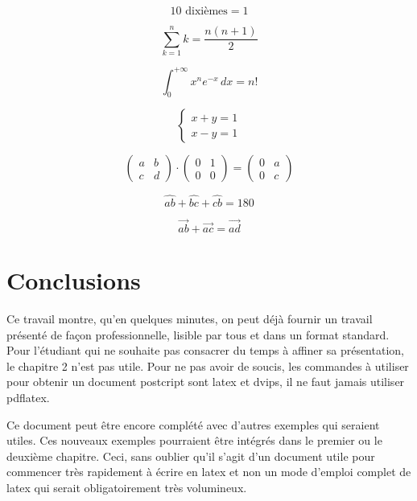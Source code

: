 $$ 10 \textrm{ dixièmes} = 1 $$

\begin{equation}
\sum_{k=1}^n k = \frac{n(n+1)}{2}
\end{equation}

\begin{equation}
\int_0^{+\infty} x^n e^{-x}\,dx = n!
\end{equation}

$$\left \{\begin{array}{c}x+y=1\\x-y=1\end{array}\right.$$

\begin{equation}
\left( \begin{array}{cc} a & b \\ c & d \end{array} \right) \cdot
\left( \begin{array}{cc} 0 & 1 \\ 0 & 0 \end{array} \right) =
\left( \begin{array}{cc} 0 & a \\ 0 & c \end{array} \right)
\end{equation}

$$\widehat{ab} + \widehat{bc} + \widehat{cb} = 180$$

$$\overrightarrow{ab} + \overrightarrow{ac} = \overrightarrow{ad}$$



\section{Conclusions}
Ce travail montre, qu'en quelques minutes, on peut déjà fournir un travail présenté de façon professionnelle, lisible par tous et dans un format standard.
Pour l'étudiant qui ne souhaite pas consacrer du temps à affiner sa présentation, le chapitre 2 n'est pas utile.
Pour ne pas avoir de soucis, les commandes à utiliser pour obtenir un document postcript sont latex et dvips, il ne faut jamais utiliser pdflatex. 

Ce document peut être encore complété avec d'autres exemples qui seraient utiles. Ces nouveaux exemples pourraient être intégrés dans le premier ou le deuxième chapitre. Ceci, sans oublier qu'il s'agit d'un document utile pour commencer très rapidement à écrire en latex et non un mode d'emploi complet de latex qui serait obligatoirement très volumineux.

